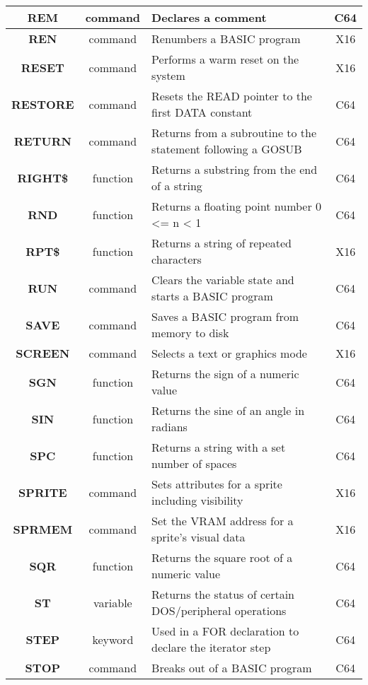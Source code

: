 \begin{longtable}{|c|c|m{4cm}|c|}
	{\bfseries REM} & command & Declares a comment & C64 \\ \hline
	{\bfseries REN} & command & Renumbers a BASIC program & X16 \\ \hline
	{\bfseries RESET} & command & Performs a warm reset on the system & X16 \\ \hline
	{\bfseries RESTORE} & command & Resets the {\ttfamily READ} pointer to the first {\ttfamily DATA} constant & C64 \\ \hline
	{\bfseries RETURN} & command & Returns from a subroutine to the statement following a GOSUB & C64 \\ \hline
	{\bfseries RIGHT\$} & function & Returns a substring from the end of a string & C64 \\ \hline
	{\bfseries RND} & function & Returns a floating point number 0 <= n < 1 & C64 \\ \hline
	{\bfseries RPT\$} & function & Returns a string of repeated characters & X16 \\ \hline
	{\bfseries RUN} & command & Clears the variable state and starts a BASIC program & C64 \\ \hline
	{\bfseries SAVE} & command & Saves a BASIC program from memory to disk & C64 \\ \hline
	{\bfseries SCREEN} & command & Selects a text or graphics mode & X16 \\ \hline
	{\bfseries SGN} & function & Returns the sign of a numeric value & C64 \\ \hline
	{\bfseries SIN} & function & Returns the sine of an angle in radians & C64 \\ \hline
	{\bfseries SPC} & function & Returns a string with a set number of spaces & C64 \\ \hline
	{\bfseries SPRITE} & command & Sets attributes for a sprite including visibility & X16 \\ \hline
	{\bfseries SPRMEM} & command & Set the VRAM address for a sprite's visual data & X16 \\ \hline
	{\bfseries SQR} & function & Returns the square root of a numeric value & C64 \\ \hline
	{\bfseries ST} & variable & Returns the status of certain DOS/peripheral operations & C64 \\ \hline
	{\bfseries STEP} & keyword & Used in a {\ttfamily FOR} declaration to declare the iterator step & C64 \\ \hline
	{\bfseries STOP} & command & Breaks out of a BASIC program & C64 \\ \hline

\end{longtable}

